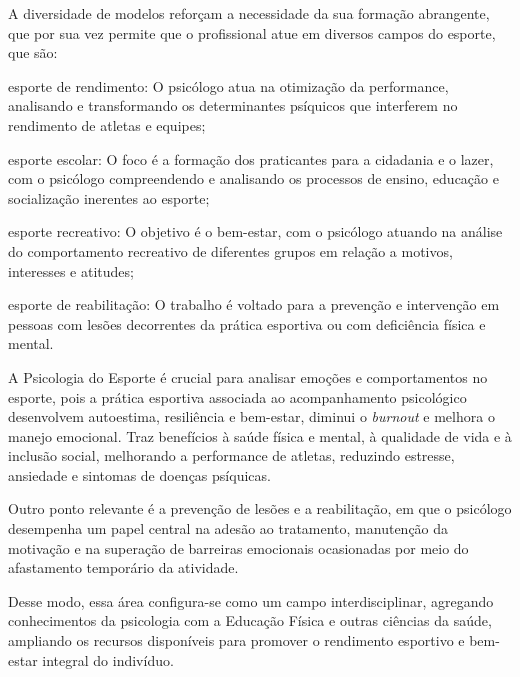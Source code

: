 \begin{Desenvolvimento}
A diversidade de modelos reforçam a necessidade da sua formação abrangente, que por sua vez permite que o profissional atue em diversos campos do esporte, que são:
\begin{alinea}
  \item esporte de rendimento: O psicólogo atua na otimização da performance, analisando e transformando os determinantes psíquicos que interferem no rendimento de atletas e equipes;
  \item esporte escolar: O foco é a formação dos praticantes para a cidadania e o lazer, com o psicólogo compreendendo e analisando os processos de ensino, educação e socialização inerentes ao esporte;
  \item esporte recreativo: O objetivo é o bem-estar, com o psicólogo atuando na análise do comportamento recreativo de diferentes grupos em relação a motivos, interesses e atitudes;
  \item esporte de reabilitação: O trabalho é voltado para a prevenção e intervenção em pessoas com lesões decorrentes da prática esportiva ou com deficiência física e mental.
\end{alinea}

A Psicologia do Esporte é crucial para analisar emoções e comportamentos no esporte, pois a prática esportiva associada ao acompanhamento psicológico desenvolvem autoestima, resiliência e bem-estar, diminui o \textit{burnout} e melhora o manejo emocional. Traz benefícios à saúde física e mental, à qualidade de vida e à inclusão social, melhorando a performance de atletas, reduzindo estresse, ansiedade e sintomas de doenças psíquicas.

Outro ponto relevante é a prevenção de lesões e a reabilitação, em que o psicólogo desempenha um papel central na adesão ao tratamento, manutenção da motivação e na superação de barreiras emocionais ocasionadas por meio do afastamento temporário da atividade.

Desse modo, essa área configura-se como um campo interdisciplinar, agregando conhecimentos da psicologia com a Educação Física e outras ciências da saúde, ampliando os recursos disponíveis para promover o rendimento esportivo e bem-estar integral do indivíduo.


\end{Desenvolvimento}
